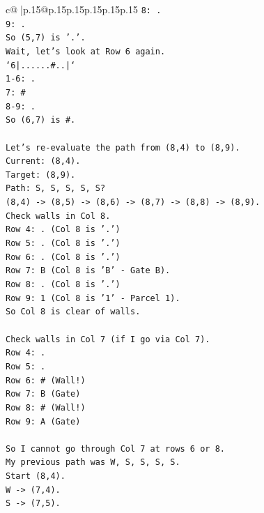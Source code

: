 \documentclass{article}
\begin{document}
{\begin{supertabular}{c@{$\;$}|p{.15\linewidth}@{}p{.15\linewidth}p{.15\linewidth}p{.15\linewidth}p{.15\linewidth}p{.15\linewidth}}
{{{\texttt{8: .} \\
\texttt{9: .} \\
\texttt{So (5,7) is '.'.} \\
\texttt{Wait, let's look at Row 6 again.} \\
\texttt{`6|......\#..|`} \\
\texttt{1{-}6: .} \\
\texttt{7: \#} \\
\texttt{8{-}9: .} \\
\texttt{So (6,7) is \#.} \\
\\ 
\texttt{Let's re{-}evaluate the path from (8,4) to (8,9).} \\
\texttt{Current: (8,4).} \\
\texttt{Target: (8,9).} \\
\texttt{Path: S, S, S, S, S?} \\
\texttt{(8,4) {-}> (8,5) {-}> (8,6) {-}> (8,7) {-}> (8,8) {-}> (8,9).} \\
\texttt{Check walls in Col 8.} \\
\texttt{Row 4: . (Col 8 is '.')} \\
\texttt{Row 5: . (Col 8 is '.')} \\
\texttt{Row 6: . (Col 8 is '.')} \\
\texttt{Row 7: B (Col 8 is 'B' {-} Gate B).} \\
\texttt{Row 8: . (Col 8 is '.')} \\
\texttt{Row 9: 1 (Col 8 is '1' {-} Parcel 1).} \\
\texttt{So Col 8 is clear of walls.} \\
\\ 
\texttt{Check walls in Col 7 (if I go via Col 7).} \\
\texttt{Row 4: .} \\
\texttt{Row 5: .} \\
\texttt{Row 6: \# (Wall!)} \\
\texttt{Row 7: B (Gate)} \\
\texttt{Row 8: \# (Wall!)} \\
\texttt{Row 9: A (Gate)} \\
\\ 
\texttt{So I cannot go through Col 7 at rows 6 or 8.} \\
\texttt{My previous path was W, S, S, S, S.} \\
\texttt{Start (8,4).} \\
\texttt{W {-}> (7,4).} \\
\texttt{S {-}> (7,5).} \\
}}}
\end{supertabular}}
\end{document}
